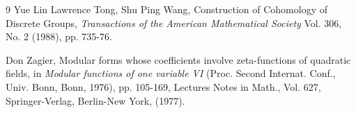 \documentclass[12pt,a4paper,reqno]{amsart}
\theoremstyle{definition}
\numberwithin{definition}{subsection}
\theoremstyle{definition}
\numberwithin{Definition}{subsection}
\theoremstyle{remark}
\theoremstyle{remark}
\numberwithin{Remark}{subsection}
\theoremstyle{remark}
\theoremstyle{plain}
\numberwithin{Theorem}{subsection}
\theoremstyle{plain}
\theoremstyle{plain}
\theoremstyle{plain}
\theoremstyle{plain}
\theoremstyle{plain}
\theoremstyle{plain}
\theoremstyle{plain}
\begin{document}
\begin{thebibliography}{9}
Yue Lin Lawrence Tong, Shu Ping Wang, Construction of Cohomology of Discrete Groups,
\textit{Transactions of the American Mathematical Society}
Vol. 306, No. 2 (1988), pp. 735-76.

Don Zagier, Modular forms whose coefficients involve zeta-functions of quadratic fields, in \emph{Modular functions of one variable VI} (Proc. Second Internat. Conf., Univ. Bonn, Bonn, 1976), pp. 105-169, Lectures Notes in Math., Vol. 627, Springer-Verlag, Berlin-New York, (1977).


\end{thebibliography}
\end{document}
